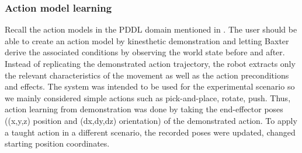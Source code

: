 

\subsubsection{Action model learning} \label{Create an action model}
Recall the action models in the PDDL domain mentioned in .
The user should be able to create an action model by kinesthetic demonstration and letting Baxter derive the associated conditions by observing the world state before and after. %
Instead of replicating the demonstrated action trajectory, the robot extracts only the relevant characteristics of the movement as well as the action preconditions and effects.
The system was intended to be used for the experimental scenario so we mainly considered simple actions such as pick-and-place, rotate, push.
Thus, action learning from demonstration was done by taking the end-effector poses (\ie (x,y,z) position and (dx,dy,dz) orientation) of the demonstrated action.
To apply a taught action in a different scenario, the recorded poses were updated, \eg changed starting position coordinates.

